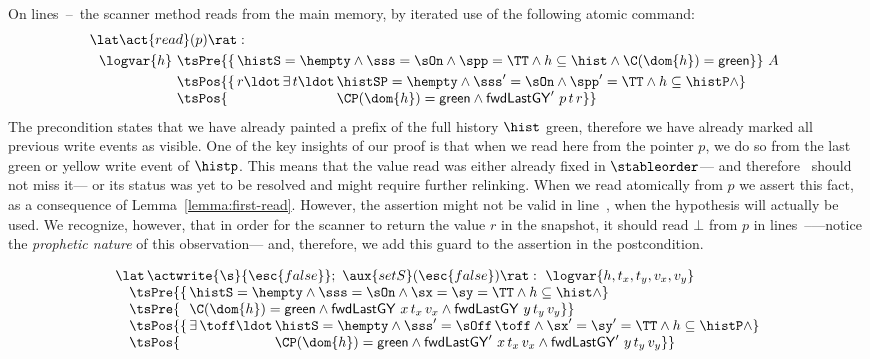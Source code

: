 On lines~\lineScanReadsX--\lineScanReadsY~the scanner method reads
from the main memory, by iterated use of the following atomic command:
\[
\begin{array}{l}
  \lat \act{read}(p) \rat:\\[3pt] ~~ \logvar{h}
  \!\begin{array}[t]{l}
     \tsPre{\{\, \histS = \hempty \wedge
       \sss = \sOn \wedge \spp = \TT \wedge
       h \subseteq \hist \wedge
       \C(\dom{h}) = \mathsf{green}\}}\ A\\[3pt]
     \tsPos{\{\, r\ldot\, \exists\, t\ldot\,
       \histSP = \hempty \wedge
       \sss' = \sOn \wedge \spp' = \TT \wedge
       h \subseteq \histP \wedge}\\
     \tsPos{\phantom{\{\, r\ldot\, \exists\, t\ldot}\,
       \CP(\dom{h}) = \mathsf{green} \wedge    
       \botLGY'\ p\, t\, r \}}
  \end{array}
\end{array}
\]
The precondition states that we have already painted a prefix of the
full history $\hist$ green, therefore we have already marked all
previous write events as visible. One of the key insights of our proof
is that when we read here from the pointer $p$, we do so from the last
green or yellow write event of $\histp$. This means that the value
read was either already fixed in $\stableorder$--- and therefore
\jyscan\ should not miss it--- or its status was yet to be resolved
and might require further relinking. When we read atomically from $p$
we assert this fact, as a consequence of
Lemma~\ref{lemma:first-read}. However, the assertion might not be
valid in line~\lineScanRelinks, when the hypothesis will actually be
used. We recognize, however, that in order for the scanner to return
the value $r$ in the snapshot, it should read $\bot$ from $p$ in
lines~\lineScanReadsFX--\lineScanReadsFY---notice the \emph{prophetic
  nature} of this observation--- and, therefore, we add this guard to
the assertion in the postcondition.

\[
\begin{array}{l}
  \lat\,\actwrite{\s}{\esc{false}};\ \aux{setS}(\esc{false}) \rat :\
  \logvar{h, t_x,t_y,v_x,v_y}\\
  ~~~
  \tsPre{\{\, \histS = \hempty \wedge
    \sss = \sOn \wedge \sx = \sy = \TT \wedge
    h \subseteq \hist \wedge}\\
  ~~~
  \tsPre{\phantom{\{\,}
    \C(\dom{h}) = \mathsf{green} \wedge
    \botLGY\ x\, t_x\, v_x \wedge
    \botLGY\ y\, t_y\, v_y \}}\\
  ~~~
  \tsPos{\{\, \exists\, \toff\ldot\, \histS = \hempty \wedge
    \sss' = \sOff\, \toff \wedge \sx' = \sy' = \TT \wedge
    h \subseteq \histP \wedge }\\
  ~~~
  \tsPos{\phantom{\{\, \exists\, \toff\ldot}\,
    \CP(\dom{h}) = \mathsf{green} \wedge
    \botLGY'\ x\, t_x\, v_x \wedge \botLGY'\ y\, t_y\, v_y \}}
\end{array}
\]

